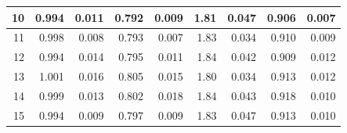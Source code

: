 \documentclass[
]{article}
\begin{document}
\begin{table}
\begin{tabular}[t]{r|r|r|r|r|r|r|r|r}
\hline
\hspace{1em}10 & 0.994 & 0.011 & 0.792 & 0.009 & 1.81 & 0.047 & 0.906 & 0.007\\
\hline
\hspace{1em}11 & 0.998 & 0.008 & 0.793 & 0.007 & 1.83 & 0.034 & 0.910 & 0.009\\
\hline
\hspace{1em}12 & 0.994 & 0.014 & 0.795 & 0.011 & 1.84 & 0.042 & 0.909 & 0.012\\
\hline
\hspace{1em}13 & 1.001 & 0.016 & 0.805 & 0.015 & 1.80 & 0.034 & 0.913 & 0.012\\
\hline
\hspace{1em}14 & 0.999 & 0.013 & 0.802 & 0.018 & 1.84 & 0.043 & 0.918 & 0.010\\
\hline
\hspace{1em}15 & 0.994 & 0.009 & 0.797 & 0.009 & 1.83 & 0.047 & 0.913 & 0.010\\
\hline
\end{tabular}
\end{table}
\end{document}
